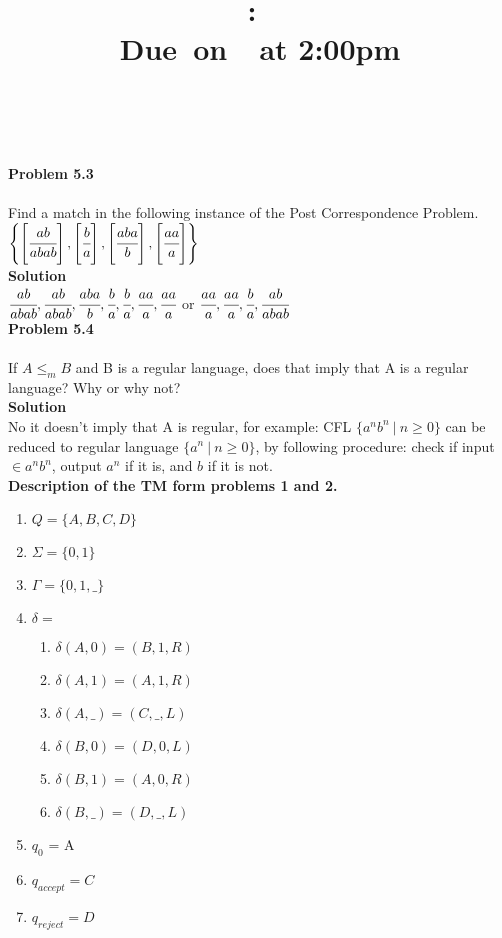 \documentclass{article}
\title{
  \vspace{2in}
  \textmd{\textbf{\hmwkClass:\ \hmwkTitle}}\\
  \normalsize\vspace{0.1in}\small{Due\ on\ \hmwkDueDate\ at 2:00pm}\\
  \vspace{0.1in}\large{\textit{\hmwkClassInstructor\ \hmwkClassTime}}
  \vspace{3in}
}
\author{\textbf{\hmwkAuthorName}}
\date{}
\newcommand\curl[1]{\{#1\}}
\newcommand{\problem}[1]{\large{\textbf{Problem #1}}\\}
\begin{document}
\maketitle

\pagebreak

\problem{5.3} \\
Find a match in the following instance of the Post Correspondence Problem.\\

$\left \{ \left [ \cfrac{ab}{abab} \right ], \left [ \cfrac{b}{a} \right ], \left [ \cfrac{aba}{b} \right ], \left [ \cfrac{aa}{a} \right ] \right \}$ \\

\textbf{Solution}\\

$\cfrac{ab}{abab}  , \cfrac{ab}{abab}, \cfrac{aba}{b} , \cfrac{b}{a} , \cfrac{b}{a} ,   \cfrac{aa}{a}, \cfrac{aa}{a}  $  or
$\cfrac{aa}{a}, \cfrac{aa}{a}, \cfrac{b}{a},\cfrac{ab}{abab}$  \\

\problem{5.4} \\

If $A \leq _m B$ and B is a regular language, does that imply that A is a regular language? Why or why not?\\

\textbf{Solution}\\

No it doesn't imply that A is regular, for example: CFL $\curl{a^nb^n\ | \ n \geq 0}$ can be reduced to regular language $\curl{a^n\ |\ n \geq 0}$, by 
following procedure:
check if input $\in a^n b^n$, output $a^n$ if it is, and $b$ if it is not. 
\\


\textbf{Description of the TM form problems 1 and 2.}\\
\begin{enumerate}[1., leftmargin = 0.5cm]
\itemsep0em
\item $Q = \curl{A,B,C,D}$
\item $\Sigma = \curl{0,1}$
\item $\Gamma = \curl{0,1,\_}$
\item $\delta = $
    \begin{enumerate}[1., leftmargin = 0.5cm]
    \itemsep0em
    \item $\delta (A,0) = (B,1,R)$
    \item $\delta (A,1) = (A,1,R)$
    \item $\delta (A,\_) = (C,\_,L)$

    \item $\delta (B,0) = (D,0,L)$
    \item $\delta (B,1) = (A,0,R)$
    \item $\delta (B,\_) = (D,\_,L)$
    \end{enumerate}
\item $q_0$ = A
\item  $q_{accept} = C$
\item  $q_{reject} = D$
\end{enumerate}
\end{document}
